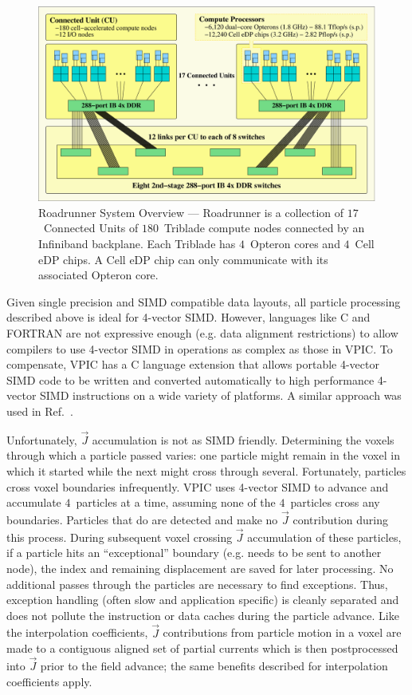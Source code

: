 \documentclass[journal,twoside]{IEEEtran}
\newcommand{\vecJ}{\vec{J}}
\begin{document}
\begin{figure}
\begin{center}
\includegraphics[width=7in]{figs/system.eps}
\caption{Roadrunner System Overview --- Roadrunner is a collection
of $17$~Connected Units of $180$~Triblade compute nodes connected by
an Infiniband backplane.  Each Triblade has $4$~Opteron cores and
$4$~Cell eDP chips.  A Cell eDP chip can only communicate with its
associated Opteron core.}
\label{fig:system}
\end{center}
\end{figure}

Given single precision and SIMD compatible data layouts, all particle
processing described above is ideal for 4-vector SIMD.  However,
languages like C and FORTRAN are not expressive enough (e.g. data
alignment restrictions) to allow compilers to use 4-vector SIMD in
operations as complex as those in VPIC.  To compensate, VPIC has a C
language extension that allows portable 4-vector SIMD code to be
written and converted automatically to high performance 4-vector SIMD
instructions on a wide variety of platforms.  A similar approach was
used in Ref.~\cite{Bowers_et_al_2006}.

Unfortunately, $\vecJ$ accumulation is not as SIMD friendly.
Determining the voxels through which a particle passed varies: one
particle might remain in the voxel in which it started while the next
might cross through several.  Fortunately, particles cross voxel
boundaries infrequently.  VPIC uses 4-vector SIMD to advance and
accumulate $4$~particles at a time, assuming none of the $4$~particles
cross any boundaries.  Particles that do are detected and make no
$\vecJ$ contribution during this process.  During subsequent voxel
crossing $\vecJ$ accumulation of these particles, if a particle hits
an ``exceptional'' boundary (e.g. needs to be sent to another node),
the index and remaining displacement are saved for later processing.
No additional passes through the particles are necessary to find
exceptions.  Thus, exception handling (often slow and application
specific) is cleanly separated and does not pollute the instruction or
data caches during the particle advance.  Like the interpolation
coefficients, $\vecJ$ contributions from particle motion in a voxel
are made to a contiguous aligned set of partial currents which is then
postprocessed into $\vecJ$ prior to the field advance; the same
benefits described for interpolation coefficients apply.
\end{document}
